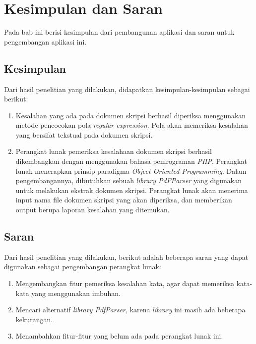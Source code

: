 \chapter{Kesimpulan dan Saran}
\label{chap:kesimpulan_dan_saran}

Pada bab ini berisi kesimpulan dari pembangunan aplikasi dan saran untuk pengembangan aplikasi ini.

\section{Kesimpulan}
\label{sec:kesimpulan}

Dari hasil penelitian yang dilakukan, didapatkan kesimpulan-kesimpulan sebagai berikut:

\begin{enumerate}
	\item Kesalahan yang ada pada dokumen skripsi berhasil diperiksa menggunakan metode pencocokan pola \textit{regular expression}. Pola akan memeriksa kesalahan yang bersifat tekstual pada dokumen skripsi. 
	
	\item Perangkat lunak pemeriksa kesalahaan dokumen skripsi berhasil dikembangkan dengan menggunakan bahasa pemrograman \textit{PHP}. Perangkat lunak menerapkan prinsip paradigma \textit{Object Oriented Programming}. Dalam pengembangannya, dibutuhkan sebuah \textit{library PdFParser} yang digunakan untuk melakukan ekstrak dokumen skripsi. Perangkat lunak akan menerima input nama file dokumen skripsi yang akan diperiksa, dan memberikan output berupa laporan kesalahan yang ditemukan.
\end{enumerate}

\section{Saran}
\label{sec:saran}
Dari hasil penelitian yang dilakukan, berikut adalah beberapa saran yang dapat digunakan sebagai pengembangan perangkat lunak:

\begin{enumerate}
	\item Mengembangkan fitur pemeriksa kesalahan kata, agar dapat memeriksa kata-kata yang menggunakan imbuhan.
	
	\item Mencari alternatif \textit{library PdfParser}, karena \textit{library} ini masih ada beberapa kekurangan.
	
	\item Menambahkan fitur-fitur yang belum ada pada perangkat lunak ini.
\end{enumerate}